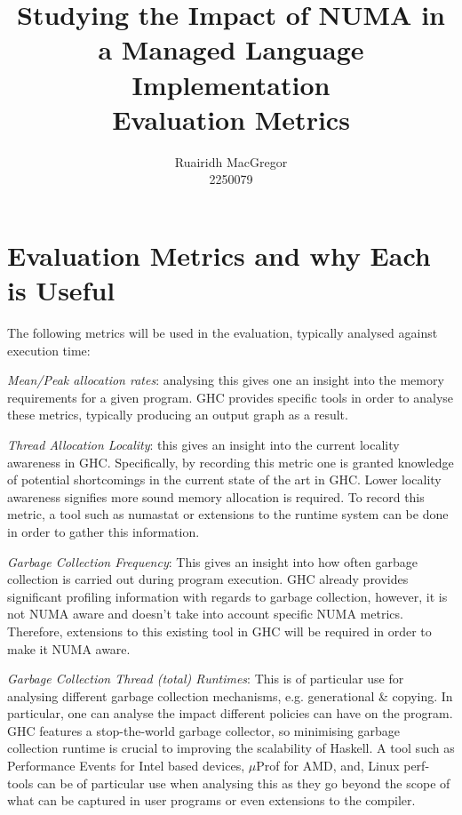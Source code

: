 \documentclass[a4paper,11pt]{article}
\title{Studying the Impact of NUMA in a Managed Language Implementation \\ Evaluation Metrics}
\author{Ruairidh MacGregor \\ 2250079}
\date{}
\begin{document}
\maketitle

\section{Evaluation Metrics and why Each is Useful}
\label{sec:metrics}

The following metrics will be used in the evaluation, typically analysed against execution time:

\begin{description}

\item \textit{Mean/Peak allocation rates}: analysing this gives one an insight into the memory requirements for a given program. GHC provides specific tools in order to analyse these metrics, typically producing an output graph as a result.
\item \textit{Thread Allocation Locality}: this gives an insight into the current locality awareness in GHC. Specifically, by recording this metric one is granted knowledge of potential shortcomings in the current state of the art in GHC. Lower locality awareness signifies more sound memory allocation is required. To record this metric, a tool such as numastat or extensions to the runtime system can be done in order to gather this information.
\item \textit{Garbage Collection Frequency}: This gives an insight into how often garbage collection is carried out during program execution. GHC already provides significant profiling information with regards to garbage collection, however, it is not NUMA aware and doesn't take into account specific NUMA metrics. Therefore, extensions to this existing tool in GHC will be required in order to make it NUMA aware.
\item \textit{Garbage Collection Thread (total) Runtimes}: This is of particular use for analysing different garbage collection mechanisms, e.g. generational \& copying. In particular, one can analyse the impact different policies can have on the program. GHC features a stop-the-world garbage collector, so minimising garbage collection runtime is crucial to improving the scalability of Haskell. A tool such as Performance Events for Intel based devices, $\mu$Prof for AMD, and, Linux perf-tools can be of particular use when analysing this as they go beyond the scope of what can be captured in user programs or even extensions to the compiler.

\end{description}
\end{document}
